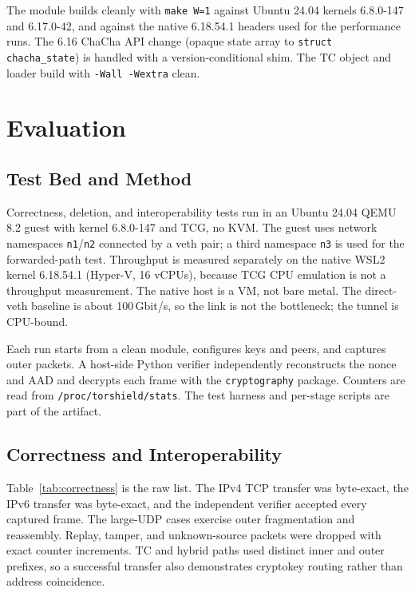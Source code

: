\documentclass[conference]{IEEEtran}
\newcommand{\code}[1]{\texttt{#1}}
\begin{document}
The module builds cleanly with \code{make W=1} against Ubuntu 24.04 kernels 6.8.0-147 and 6.17.0-42, and against the native 6.18.54.1 headers used for the performance runs. The 6.16 ChaCha API change (opaque state array to \code{struct chacha\_state}) is handled with a version-conditional shim. The TC object and loader build with \code{-Wall -Wextra} clean.

\section{Evaluation}
\label{sec:eval}

\subsection{Test Bed and Method}
Correctness, deletion, and interoperability tests run in an Ubuntu 24.04 QEMU 8.2 guest with kernel 6.8.0-147 and TCG, no KVM. The guest uses network namespaces \code{n1}/\code{n2} connected by a veth pair; a third namespace \code{n3} is used for the forwarded-path test. Throughput is measured separately on the native WSL2 kernel 6.18.54.1 (Hyper-V, 16 vCPUs), because TCG CPU emulation is not a throughput measurement. The native host is a VM, not bare metal. The direct-veth baseline is about 100\,Gbit/s, so the link is not the bottleneck; the tunnel is CPU-bound.

Each run starts from a clean module, configures keys and peers, and captures outer packets. A host-side Python verifier independently reconstructs the nonce and AAD and decrypts each frame with the \code{cryptography} package. Counters are read from \code{/proc/torshield/stats}. The test harness and per-stage scripts are part of the artifact.

\subsection{Correctness and Interoperability}
Table~\ref{tab:correctness} is the raw list. The IPv4 TCP transfer was byte-exact, the IPv6 transfer was byte-exact, and the independent verifier accepted every captured frame. The large-UDP cases exercise outer fragmentation and reassembly. Replay, tamper, and unknown-source packets were dropped with exact counter increments. TC and hybrid paths used distinct inner and outer prefixes, so a successful transfer also demonstrates cryptokey routing rather than address coincidence.
\end{document}
